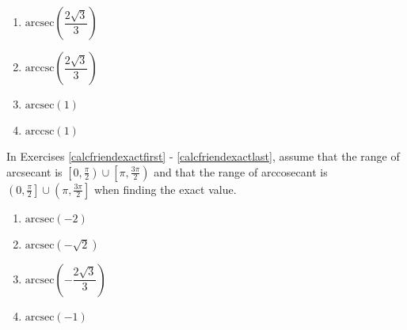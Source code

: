 \begin{multicols}{4}

\begin{enumerate}

\setcounter{enumi}{\value{HW}}

\item $\mbox{arcsec} \left( \dfrac{2\sqrt{3}}{3} \right)$
\item $\mbox{arccsc} \left( \dfrac{2\sqrt{3}}{3} \right)$
\item $\mbox{arcsec} \left( 1 \right)$ 
\item $\mbox{arccsc} \left( 1 \right)$  \label{exactvaluearclast}

\setcounter{HW}{\value{enumi}}

\end{enumerate}

\end{multicols}

In Exercises \ref{calcfriendexactfirst} - \ref{calcfriendexactlast}, assume that the range of arcsecant is $\left[0, \frac{\pi}{2} \right) \cup \left[\pi, \frac{3\pi}{2} \right)$ and that the range of arccosecant is $\left(0, \frac{\pi}{2} \right] \cup \left( \pi, \frac{3\pi}{2} \right]$ when finding the exact value.

\begin{multicols}{4} 

\begin{enumerate}

\setcounter{enumi}{\value{HW}}

\item $\mbox{arcsec} \left( -2 \right)$  \label{calcfriendexactfirst}
\item $\mbox{arcsec} \left( -\sqrt{2} \right)$  
\item $\mbox{arcsec} \left( -\dfrac{2\sqrt{3}}{3} \right)$
\item $\mbox{arcsec} \left( -1 \right)$  

\setcounter{HW}{\value{enumi}}

\end{enumerate}

\end{multicols}

